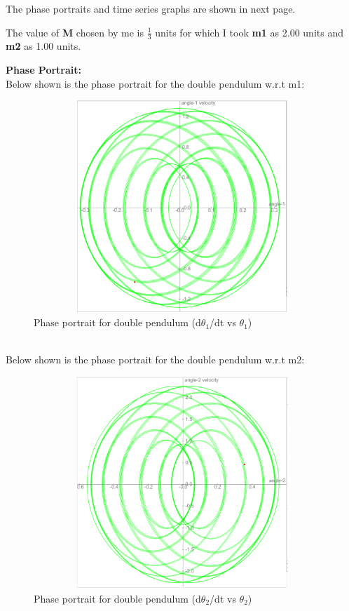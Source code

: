 \documentclass[11pt]{scrartcl} %
\begin{document}
The phase portraits and time series graphs are shown in next page.

The value of \textbf{M} chosen by me is $\frac{1}{3}$ units for which I took \textbf{m1} as 2.00 units and \textbf{m2} as 1.00 units.\newpage

\textbf{Phase Portrait:}\\
Below shown is the phase portrait for the double pendulum w.r.t m1:
\begin{figure}[h] %
	\centering
	\includegraphics[width=12cm, height=8cm]{4a_phase(1).PNG} %
	\caption{Phase portrait for double pendulum (d$\theta_{1}$/dt vs $\theta_{1}$)}
\end{figure}
\\
Below shown is the phase portrait for the double pendulum w.r.t m2:
\begin{figure}[h] %
	\centering
	\includegraphics[width=12cm, height=8cm]{4a_phase(2).PNG} %
	\caption{Phase portrait for double pendulum (d$\theta_{2}$/dt vs $\theta_{2}$)}
\end{figure}
\end{document}
